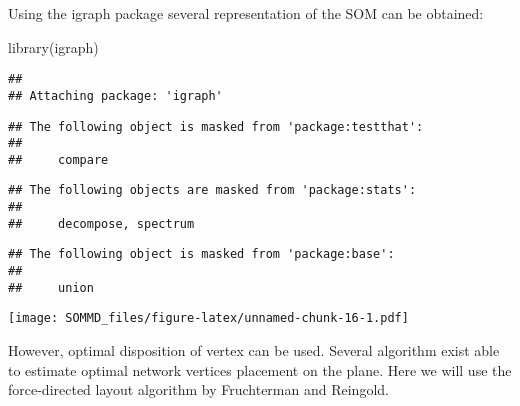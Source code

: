 \documentclass[
]{article}
\newenvironment{Shaded}{\begin{snugshade}}{\end{snugshade}}
\newcommand{\AttributeTok}[1]{\textcolor[rgb]{0.77,0.63,0.00}{#1}}
\newcommand{\CommentTok}[1]{\textcolor[rgb]{0.56,0.35,0.01}{\textit{#1}}}
\newcommand{\ConstantTok}[1]{\textcolor[rgb]{0.00,0.00,0.00}{#1}}
\newcommand{\DecValTok}[1]{\textcolor[rgb]{0.00,0.00,0.81}{#1}}
\newcommand{\FloatTok}[1]{\textcolor[rgb]{0.00,0.00,0.81}{#1}}
\newcommand{\FunctionTok}[1]{\textcolor[rgb]{0.00,0.00,0.00}{#1}}
\newcommand{\NormalTok}[1]{#1}
\newcommand{\OtherTok}[1]{\textcolor[rgb]{0.56,0.35,0.01}{#1}}
\newcommand{\SpecialCharTok}[1]{\textcolor[rgb]{0.00,0.00,0.00}{#1}}
\newcommand{\StringTok}[1]{\textcolor[rgb]{0.31,0.60,0.02}{#1}}
\begin{document}
Using the igraph package several representation of the SOM can be
obtained:

\begin{Shaded}
\begin{Highlighting}[]
\FunctionTok{library}\NormalTok{(igraph)}
\end{Highlighting}
\end{Shaded}

\begin{verbatim}
## 
## Attaching package: 'igraph'
\end{verbatim}

\begin{verbatim}
## The following object is masked from 'package:testthat':
## 
##     compare
\end{verbatim}

\begin{verbatim}
## The following objects are masked from 'package:stats':
## 
##     decompose, spectrum
\end{verbatim}

\begin{verbatim}
## The following object is masked from 'package:base':
## 
##     union
\end{verbatim}

\begin{Shaded}
\end{Shaded}

\texttt{[image: SOMMD\_files/figure-latex/unnamed-chunk-16-1.pdf]}

However, optimal disposition of vertex can be used. Several algorithm
exist able to estimate optimal network vertices placement on the plane.
Here we will use the force-directed layout algorithm by Fruchterman and
Reingold.

\begin{Shaded}
\end{Shaded}
\end{document}
